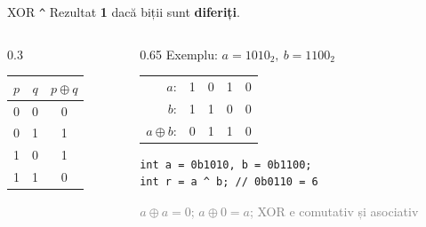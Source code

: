 ﻿\documentclass{beamer}
\begin{document}
\begin{frame}[fragile]{XOR \textemdash{} \texttt{\textasciicircum}}
  Rezultat \textbf{1} dacă biții sunt \textbf{diferiți}.
  \bigskip
  \begin{columns}[T]
    \begin{column}{0.3\textwidth}
      \begin{center}
      \begin{tabular}{ccc}
        \toprule
        $p$ & $q$ & $p \oplus q$ \\
        \midrule
        0 & 0 & 0 \\
        0 & 1 & 1 \\
        1 & 0 & 1 \\
        1 & 1 & 0 \\
        \bottomrule
      \end{tabular}
      \end{center}
    \end{column}
    \begin{column}{0.65\textwidth}
      Exemplu: $a = 1010_2,\ b = 1100_2$
      \begin{center}
      \begin{tabular}{rcccc}
        $a$:            & 1 & 0 & 1 & 0 \\
        $b$:            & 1 & 1 & 0 & 0 \\
        \hline
        $a \oplus b$:   & 0 & 1 & 1 & 0 \\
      \end{tabular}
      \end{center}
      \begin{center}
      \begin{lstlisting}
int a = 0b1010, b = 0b1100;
int r = a ^ b; // 0b0110 = 6
      \end{lstlisting}
      \end{center}
      {\footnotesize\textcolor{gray}{$a \oplus a = 0$; \quad $a \oplus 0 = a$; \quad XOR e comutativ și asociativ}}
    \end{column}
  \end{columns}
\end{frame}
\end{document}
